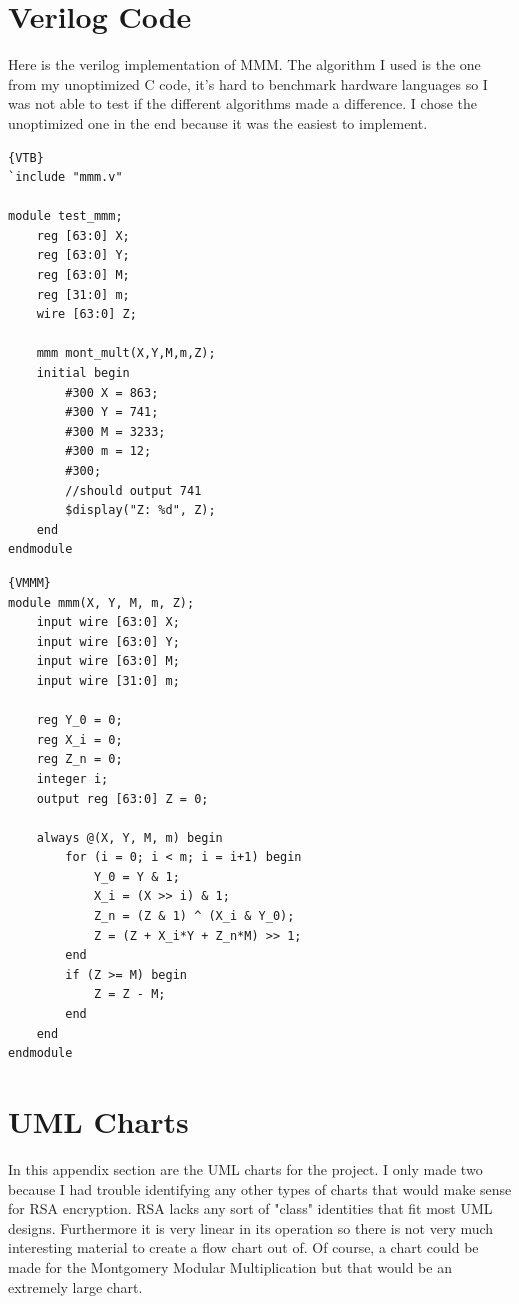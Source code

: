 \documentclass[12pt]{article}
\begin{document}
\appendix 
\section{Verilog Code}

Here is the verilog implementation of MMM. The algorithm I used is the one from my unoptimized C code, it's hard to benchmark hardware languages so I was not able to test if the different algorithms made a difference. I chose the unoptimized one in the end because it was the easiest to implement. 

\begin{minipage}{.40\textwidth}
\begin{lstlisting}[caption=Test Bench,frame=tlrb]{VTB}
`include "mmm.v"

module test_mmm;
    reg [63:0] X;
    reg [63:0] Y;
    reg [63:0] M;
    reg [31:0] m;
    wire [63:0] Z;
    
	mmm mont_mult(X,Y,M,m,Z);
	initial begin
        #300 X = 863;
        #300 Y = 741;
        #300 M = 3233;
        #300 m = 12;
        #300;
        //should output 741
		$display("Z: %d", Z); 
    end
endmodule
\end{lstlisting}
\end{minipage}\hfill
\begin{minipage}{.50\textwidth}
\begin{lstlisting}[caption=MMM Module,frame=tlrb]{VMMM}
module mmm(X, Y, M, m, Z);
    input wire [63:0] X;
    input wire [63:0] Y;
    input wire [63:0] M;
    input wire [31:0] m;
    
    reg Y_0 = 0;
    reg X_i = 0;
    reg Z_n = 0;
    integer i;
    output reg [63:0] Z = 0;
    
    always @(X, Y, M, m) begin
        for (i = 0; i < m; i = i+1) begin
            Y_0 = Y & 1;
            X_i = (X >> i) & 1;
            Z_n = (Z & 1) ^ (X_i & Y_0);
            Z = (Z + X_i*Y + Z_n*M) >> 1;
        end
        if (Z >= M) begin
            Z = Z - M;
        end
    end
endmodule
\end{lstlisting}
\end{minipage}


\section{UML Charts}

In this appendix section are the UML charts for the project. I only made two because I had trouble identifying any other types of charts that would make sense for RSA encryption. RSA lacks any sort of "class" identities that fit most UML designs. Furthermore it is very linear in its operation so there is not very much interesting material to create a flow chart out of. Of course, a chart could be made for the Montgomery Modular Multiplication but that would be an extremely large chart. 
\end{document}

